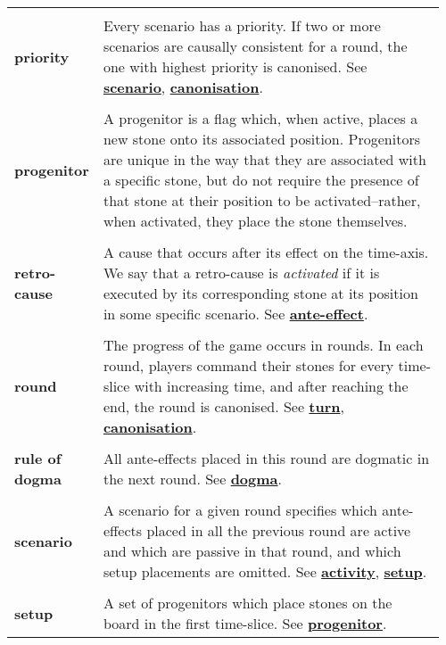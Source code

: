 {\begin{longtable}{ R{0.15\linewidth}  L{0.81\linewidth}  }
 \\* \textbf{priority} & \parbox[t]{\linewidth}{Every scenario has a priority. If two or more scenarios are causally consistent for a round, the one with highest priority is canonised. See \hyperref[glossary:scenario]{\textbf{scenario}}, \hyperref[glossary:canonisation]{\textbf{canonisation}}.}\\
 \\* \textbf{progenitor} & \parbox[t]{\linewidth}{A progenitor is a flag which, when active, places a new stone onto its associated position. Progenitors are unique in the way that they are associated with a specific stone, but do not require the presence of that stone at their position to be activated--rather, when activated, they place the stone themselves.}\\
 \\* \textbf{retro-cause} & \parbox[t]{\linewidth}{A cause that occurs after its effect on the time-axis. We say that a retro-cause is \textit{activated} if it is executed by its corresponding stone at its position in some specific scenario. See \hyperref[glossary:ante-effect]{\textbf{ante-effect}}.}\\
 \\* \textbf{round} & \parbox[t]{\linewidth}{The progress of the game occurs in rounds. In each round, players command their stones for every time-slice with increasing time, and after reaching the end, the round is canonised. See \hyperref[glossary:turn]{\textbf{turn}}, \hyperref[glossary:canonisation]{\textbf{canonisation}}.}\\
 \\* \textbf{rule of dogma} & \parbox[t]{\linewidth}{All ante-effects placed in this round are dogmatic in the next round. See \hyperref[glossary:dogma]{\textbf{dogma}}.}\\
 \\* \textbf{scenario} & \parbox[t]{\linewidth}{A scenario for a given round specifies which ante-effects placed in all the previous round are active and which are passive in that round, and which setup placements are omitted. See \hyperref[glossary:activity]{\textbf{activity}}, \hyperref[glossary:setup]{\textbf{setup}}.}\\
 \\* \textbf{setup} & \parbox[t]{\linewidth}{A set of progenitors which place stones on the board in the first time-slice. See \hyperref[glossary:progenitor]{\textbf{progenitor}}.}\\

\end{longtable}}
